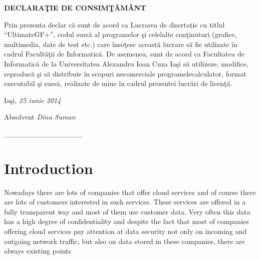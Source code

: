 \documentclass[12pt,english,hidelinks]{article}
\begin{document}
\pagebreak{}\pagestyle{empty}\textbf{\large{}DECLARAŢIE DE CONSIMŢĂMÂNT}{\large \par}

\vspace{2cm}


Prin prezenta declar că sunt de acord ca Lucrarea de disertație cu
titlul “UltimateGF+”, codul sursă al programelor şi celelalte conţinuturi
(grafice, multimedia, date de test etc.) care însoţesc această lucrare
să fie utilizate în cadrul Facultăţii de Informatică. De asemenea,
sunt de acord ca Facultatea de Informatică de la Universitatea Alexandru
Ioan Cuza Iaşi să utilizeze, modifice, reproducă şi să distribuie
în scopuri necomerciale programelecalculator, format executabil şi
sursă, realizate de mine în cadrul prezentei lucrări de licenţă.

\vspace{2.5cm}


Iaşi, \textit{25 iunie 2014}

\vspace{1.5cm}


\begin{flushright}
Absolvent \textit{Dinu Suman~~~\hspace{4em}}
\par\end{flushright}

\begin{flushright}
\_\_\_\_\_\_\_\_\_\_\_\_\_\_\_\textit{\hspace{4em}}
\par\end{flushright}

\pagebreak{}

\pagestyle{empty}

\tableofcontents{}

\pagebreak{}

\setcounter{page}{1}
\pagestyle{plain}

\section{Introduction}
Nowadays there are lots of companies that offer cloud services and of course there are lots of customers interested in such services. These services are offered in a fully transparent way and most of them use customer data. Very often this data has a high degree of confidentiality and despite the fact that most of companies offering cloud services pay attention at data security not only on incoming and outgoing network traffic, but also on data stored in these companies, there are always existing points
\end{document}
